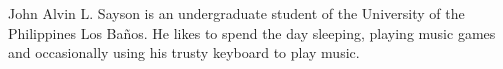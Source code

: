 \documentclass[journal]{./IEEE/IEEEtran}
\begin{document}




\nocite{*}

\begin{biography}
{John Alvin L. Sayson} is an undergraduate student of the University of the Philippines Los Ba\~{n}os. He likes to spend the day sleeping, playing music games and occasionally using his trusty keyboard to play music.
\end{biography}
\end{document}
